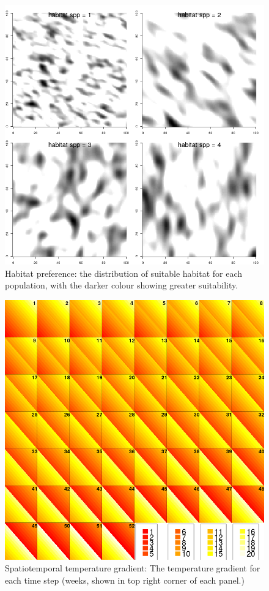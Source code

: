 \documentclass[review]{elsarticle}
\begin{document}
\begin{figure}[!ht]
	\includegraphics[width = \linewidth]{../analysis/habitat}
	\caption{Habitat preference: the distribution of suitable habitat for
		each population, with the darker colour showing greater
		suitability.}
	\label{fig:1}
\end{figure}	

\begin{figure}[!ht]
	\includegraphics[width = \linewidth]{Plots/Temperature_gradient}
	\caption{Spatiotemporal temperature gradient: The temperature gradient
	for each time step (weeks, shown in top right corner of each panel.)}
	\label{fig:3}
\end{figure}
\end{document}
